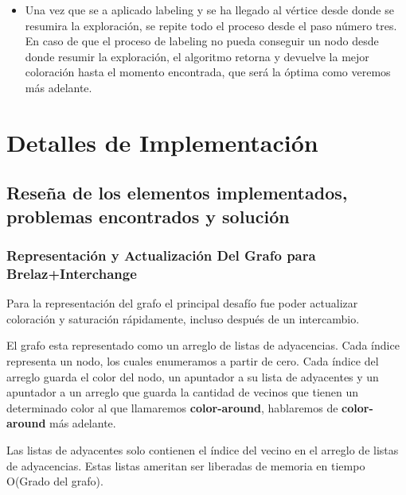 \documentclass[a4paper,10pt]{article}
\begin{document}
\begin{itemize}
\begin{itemize}
	      uno y se hace backtrack hasta el primer v\'ertice
	      coloreado con el color m\'as alto usado y se aplica el
	      proceso de labeling propuesto por Peemoller.
	\item Si se lleg\'o a un v\'ertice con un conjunto de colores
	      posibles vac\'io, se aplica el procedimento de labeling de
	      Peemoller directamente.
      \end{itemize}
\item Una vez que se a aplicado labeling y se ha llegado al v\'ertice
      desde donde se resumira la exploraci\'on, se repite todo el
      proceso desde el paso n\'umero tres. En caso de que el proceso de
      labeling no pueda conseguir un nodo desde donde resumir la
      exploraci\'on, el algoritmo retorna y devuelve la mejor
      coloraci\'on hasta el momento encontrada, que ser\'a la \'optima
      como veremos m\'as adelante.
\end{itemize}
       
\newpage
\section{Detalles de Implementación}

\subsection{Reseña de los elementos implementados, problemas encontrados y solución}

\subsubsection{Representación y Actualización Del Grafo para Brelaz+Interchange}

Para la representación del grafo el principal desafío fue poder
actualizar coloración y saturación rápidamente, incluso después de un
intercambio.

El grafo esta representado como un arreglo de listas de
adyacencias. Cada índice representa un nodo, los cuales enumeramos a
partir de cero. Cada índice del arreglo guarda el color del nodo, un
apuntador a su lista de adyacentes y un apuntador a un arreglo que
guarda la cantidad de vecinos que tienen un determinado color al que
llamaremos \textbf{color-around}, hablaremos de \textbf{color-around}
más adelante.

Las listas de adyacentes solo contienen el índice del vecino en el
arreglo de listas de adyacencias. Estas listas ameritan ser liberadas de
memoria en tiempo O(Grado del grafo).
\end{document}
